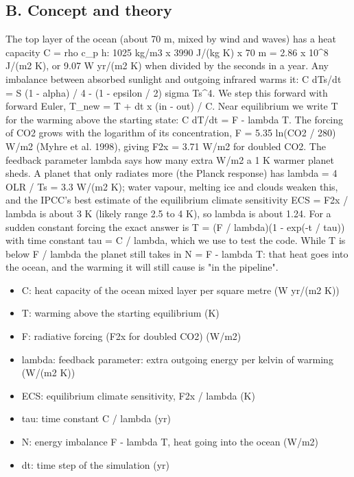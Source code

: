 \documentclass[11pt,a4paper]{article}
\begin{document}
\subsection*{B. Concept and theory}
The top layer of the ocean (about 70 m, mixed by wind and waves) has a heat capacity C = rho c\_p h: 1025 kg/m3 x 3990 J/(kg K) x 70 m = 2.86 x 10\textasciicircum{}8 J/(m2 K), or 9.07 W yr/(m2 K) when divided by the seconds in a year. Any imbalance between absorbed sunlight and outgoing infrared warms it: C dTs/dt = S (1 - alpha) / 4 - (1 - epsilon / 2) sigma Ts\textasciicircum{}4. We step this forward with forward Euler, T\_new = T + dt x (in - out) / C. Near equilibrium we write T for the warming above the starting state: C dT/dt = F - lambda T. The forcing of CO2 grows with the logarithm of its concentration, F = 5.35 ln(CO2 / 280) W/m2 (Myhre et al. 1998), giving F2x = 3.71 W/m2 for doubled CO2. The feedback parameter lambda says how many extra W/m2 a 1 K warmer planet sheds. A planet that only radiates more (the Planck response) has lambda = 4 OLR / Ts = 3.3 W/(m2 K); water vapour, melting ice and clouds weaken this, and the IPCC's best estimate of the equilibrium climate sensitivity ECS = F2x / lambda is about 3 K (likely range 2.5 to 4 K), so lambda is about 1.24. For a sudden constant forcing the exact answer is T = (F / lambda)(1 - exp(-t / tau)) with time constant tau = C / lambda, which we use to test the code. While T is below F / lambda the planet still takes in N = F - lambda T: that heat goes into the ocean, and the warming it will still cause is "in the pipeline".

\begin{itemize}[nosep]
\item C: heat capacity of the ocean mixed layer per square metre (W yr/(m2 K))
\item T: warming above the starting equilibrium (K)
\item F: radiative forcing (F2x for doubled CO2) (W/m2)
\item lambda: feedback parameter: extra outgoing energy per kelvin of warming (W/(m2 K))
\item ECS: equilibrium climate sensitivity, F2x / lambda (K)
\item tau: time constant C / lambda (yr)
\item N: energy imbalance F - lambda T, heat going into the ocean (W/m2)
\item dt: time step of the simulation (yr)
\end{itemize}
\end{document}
